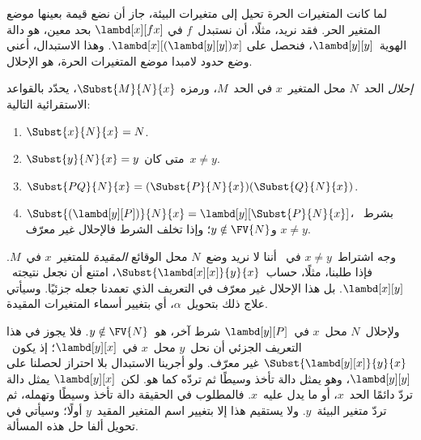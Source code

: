 \documentclass[../../../include/open-logic-section]{subfiles}
\begin{document}

\begin{explain}
لما كانت المتغيرات الحرة تحيل إلى متغيرات البيئة، جاز أن نضع قيمة بعينها موضع المتغير الحر.
فقد نريد، مثلًا، أن نستبدل~$f$ في
$\lambd[x][f x]$ بحد معين، هو دالة الهوية~$\lambd[y][y]$، فنحصل على
$\lambd[x][(\lambd[y][y]) x]$. وهذا الاستبدال، أعني وضع حدود لامبدا موضع المتغيرات الحرة، هو الإحلال.
\end{explain}

\begin{defn}[الإحلال] 
  \emph{إحلال} الحد~$N$ محل المتغير~$x$ في الحد~$M$، ورمزه
  $\Subst{M}{N}{x}$، يحدّد بالقواعد الاستقرائية التالية:
  \begin{enumerate}
    \item $\Subst{x}{N}{x} = N$.  
    \item $\Subst{y}{N}{x}  = y$ متى كان~$x \neq y$.  
    \item $\Subst{PQ}{N}{x}  = (\Subst{P}{N}{x}) (\Subst{Q}{N}{x})$.
    \item $\Subst{(\lambd[y][P])}{N}{x} = \lambd[y][\Subst{P}{N}{x}]$،
      بشرط~$x \neq y$ و$y \notin \FV{N}$؛ وإذا تخلف الشرط فالإحلال غير معرّف.
  \end{enumerate}
\end{defn}

\begin{explain}
وجه اشتراط~$x
\neq y$ في~
أننا لا نريد وضع~$N$ محل الوقائع \emph{المقيدة} للمتغير~$x$
في~$M$. فإذا طلبنا، مثلًا، حساب~$\Subst{\lambd[x][x]}{y}{x}$، امتنع أن نجعل نتيجته~$\lambd[x][y]$.
بل هذا الإحلال غير معرّف في التعريف الذي تعمدنا جعله جزئيًا.
وسيأتي علاج ذلك بتحويل~$\alpha$، أي بتغيير أسماء المتغيرات المقيدة.

ولإحلال~$N$ محل~$x$ في~$\lambd[y][P]$ شرط آخر، هو~$y
\notin \FV{N}$.
فلا يجوز في هذا التعريف الجزئي أن نحل~$y$ محل~$x$ في~$\lambd[y][x]$؛
إذ يكون~$\Subst{\lambd[y][x]}{y}{x}$ غير معرّف. ولو أجرينا الاستبدال بلا احتراز لحصلنا على
$\lambd[y][y]$، وهو يمثل دالة تأخذ وسيطًا ثم تردّه كما هو.
لكن~$\lambd[y][x]$ يمثل دالة تردّ دائمًا الحد~$x$، أو ما يدل عليه~$x$.
فالمطلوب في الحقيقة دالة تأخذ وسيطًا وتهمله، ثم تردّ متغير البيئة~$y$.
ولا يستقيم هذا إلا بتغيير اسم المتغير المقيد~$y$ أولًا؛ وسيأتي في تحويل ألفا حل هذه المسألة.
\end{explain}
\end{document}
